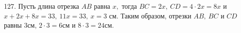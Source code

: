 127.  Пусть длина отрезка $AB$ равна $x,$ тогда $BC=2x,\ CD=4\cdot2x=8x$ и $x+2x+8x=33,\ 11x=33,\ x=3$ см. Таким образом, отрезки $AB,\ BC$ и $CD$ равны 3см, $2\cdot3=6$см и $8\cdot3=24$см.\\
